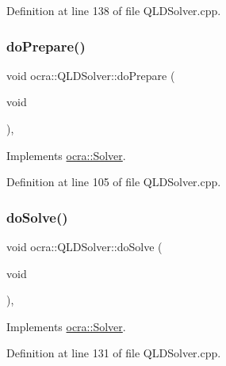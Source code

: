 Definition at line 138 of file Q\+L\+D\+Solver.\+cpp.

\hypertarget{classocra_1_1QLDSolver_ac590e2b4c851042177e8e4b84f946ced}{}\label{classocra_1_1QLDSolver_ac590e2b4c851042177e8e4b84f946ced} 
\subsubsection{\texorpdfstring{do\+Prepare()}{doPrepare()}}
{\footnotesize\ttfamily void ocra\+::\+Q\+L\+D\+Solver\+::do\+Prepare (\begin{DoxyParamCaption}\item[{void}]{ }\end{DoxyParamCaption})\hspace{0.3cm}{\ttfamily [protected]}, {\ttfamily [virtual]}}



Implements \hyperlink{classocra_1_1Solver_a9ab90e87025e3da7239141c48d28ab4a}{ocra\+::\+Solver}.



Definition at line 105 of file Q\+L\+D\+Solver.\+cpp.

\hypertarget{classocra_1_1QLDSolver_acf5bca219fc8a5be246589f76097a6e0}{}\label{classocra_1_1QLDSolver_acf5bca219fc8a5be246589f76097a6e0} 
\subsubsection{\texorpdfstring{do\+Solve()}{doSolve()}}
{\footnotesize\ttfamily void ocra\+::\+Q\+L\+D\+Solver\+::do\+Solve (\begin{DoxyParamCaption}\item[{void}]{ }\end{DoxyParamCaption})\hspace{0.3cm}{\ttfamily [protected]}, {\ttfamily [virtual]}}



Implements \hyperlink{classocra_1_1Solver_ace2d7cfe741611de6dc87a0de7e7f3a9}{ocra\+::\+Solver}.



Definition at line 131 of file Q\+L\+D\+Solver.\+cpp.

\hypertarget{classocra_1_1QLDSolver_a267add4e76edafa27e41574e14a5b17f}{}\label{classocra_1_1QLDSolver_a267add4e76edafa27e41574e14a5b17f} 
